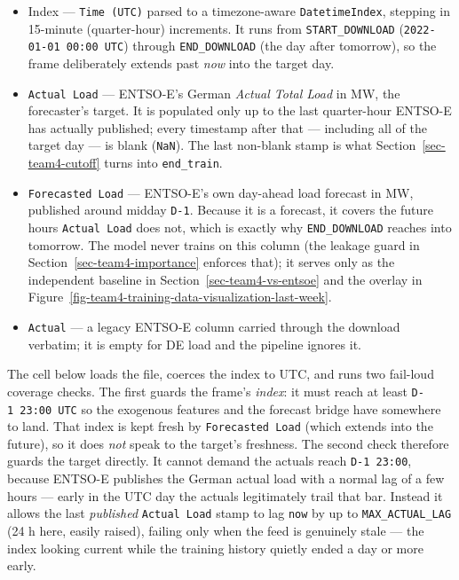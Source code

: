 \documentclass[
  english,
  letterpaper,
]{scrbook}
\providecommand{\tightlist}{%
  \setlength{\itemsep}{0pt}\setlength{\parskip}{0pt}}
\begin{document}
\begin{itemize}
\tightlist
\item
  Index --- \texttt{Time\ (UTC)} parsed to a timezone-aware
  \texttt{DatetimeIndex}, stepping in 15-minute (quarter-hour)
  increments. It runs from \texttt{START\_DOWNLOAD}
  (\texttt{2022-01-01\ 00:00\ UTC}) through \texttt{END\_DOWNLOAD} (the
  day after tomorrow), so the frame deliberately extends past \emph{now}
  into the target day.
\item
  \texttt{Actual\ Load} --- ENTSO-E's German \emph{Actual Total Load} in
  MW, the forecaster's target. It is populated only up to the last
  quarter-hour ENTSO-E has actually published; every timestamp after
  that --- including all of the target day --- is blank (\texttt{NaN}).
  The last non-blank stamp is what Section~\ref{sec-team4-cutoff} turns
  into \texttt{end\_train}.
\item
  \texttt{Forecasted\ Load} --- ENTSO-E's own day-ahead load forecast in
  MW, published around midday \texttt{D-1}. Because it is a forecast, it
  covers the future hours \texttt{Actual\ Load} does not, which is
  exactly why \texttt{END\_DOWNLOAD} reaches into tomorrow. The model
  never trains on this column (the leakage guard in
  Section~\ref{sec-team4-importance} enforces that); it serves only as
  the independent baseline in Section~\ref{sec-team4-vs-entsoe} and the
  overlay in
  Figure~\ref{fig-team4-training-data-visualization-last-week}.
\item
  \texttt{Actual} --- a legacy ENTSO-E column carried through the
  download verbatim; it is empty for DE load and the pipeline ignores
  it.
\end{itemize}

The cell below loads the file, coerces the index to UTC, and runs two
fail-loud coverage checks. The first guards the frame's \emph{index}: it
must reach at least \texttt{D-1\ 23:00\ UTC} so the exogenous features
and the forecast bridge have somewhere to land. That index is kept fresh
by \texttt{Forecasted\ Load} (which extends into the future), so it does
\emph{not} speak to the target's freshness. The second check therefore
guards the target directly. It cannot demand the actuals reach
\texttt{D-1\ 23:00}, because ENTSO-E publishes the German actual load
with a normal lag of a few hours --- early in the UTC day the actuals
legitimately trail that bar. Instead it allows the last \emph{published}
\texttt{Actual\ Load} stamp to lag \texttt{now} by up to
\texttt{MAX\_ACTUAL\_LAG} (24 h here, easily raised), failing only when
the feed is genuinely stale --- the index looking current while the
training history quietly ended a day or more early.
\end{document}
